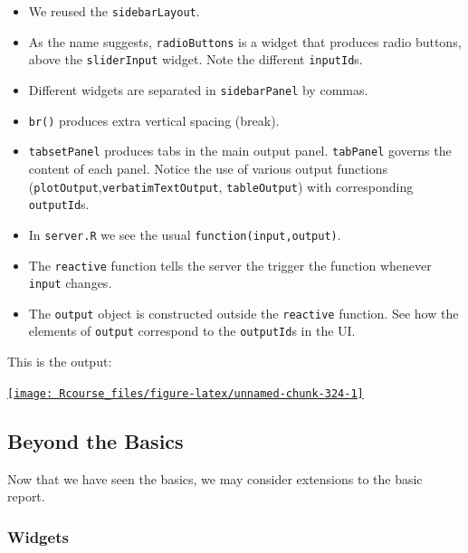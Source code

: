 \documentclass[]{book}
\providecommand{\tightlist}{%
  \setlength{\itemsep}{0pt}\setlength{\parskip}{0pt}}
\theoremstyle{definition}
\theoremstyle{definition}
\theoremstyle{definition}
\theoremstyle{remark}
\begin{document}
\begin{itemize}
\tightlist
\item
  We reused the \texttt{sidebarLayout}.
\item
  As the name suggests, \texttt{radioButtons} is a widget that produces
  radio buttons, above the \texttt{sliderInput} widget. Note the
  different \texttt{inputId}s.
\item
  Different widgets are separated in \texttt{sidebarPanel} by commas.
\item
  \texttt{br()} produces extra vertical spacing (break).
\item
  \texttt{tabsetPanel} produces tabs in the main output panel.
  \texttt{tabPanel} governs the content of each panel. Notice the use of
  various output functions
  (\texttt{plotOutput},\texttt{verbatimTextOutput},
  \texttt{tableOutput}) with corresponding \texttt{outputId}s.
\item
  In \texttt{server.R} we see the usual \texttt{function(input,output)}.
\item
  The \texttt{reactive} function tells the server the trigger the
  function whenever \texttt{input} changes.
\item
  The \texttt{output} object is constructed outside the
  \texttt{reactive} function. See how the elements of \texttt{output}
  correspond to the \texttt{outputId}s in the UI.
\end{itemize}

This is the output:

\href{https://shiny.rstudio.com/gallery/tabsets.html}{\texttt{[image: Rcourse\_files/figure-latex/unnamed-chunk-324-1]} }

\subsection{Beyond the Basics}\label{beyond-the-basics}

Now that we have seen the basics, we may consider extensions to the
basic report.

\subsubsection{Widgets}\label{widgets}
\end{document}
